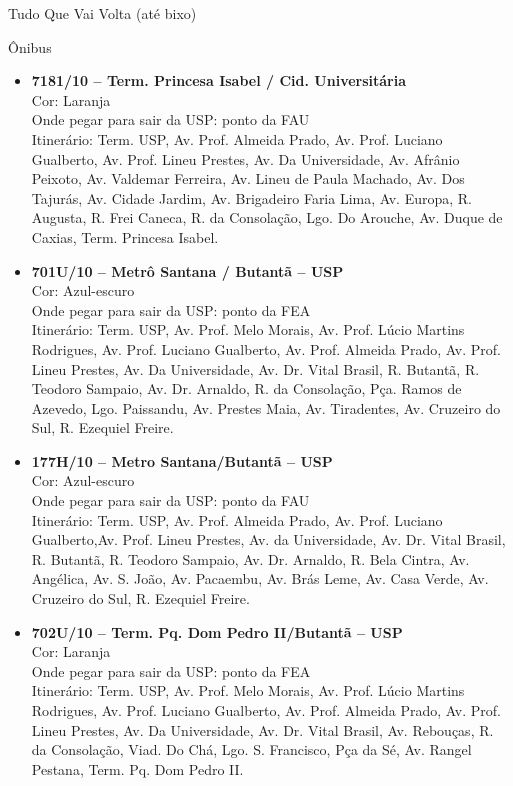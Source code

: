 \begin{secao}{Tudo Que Vai Volta (até bixo)}
\begin{subsecao}{Ônibus}
\begin{itemize}
	\item {\bf 7181/10 – Term. Princesa Isabel / Cid. Universitária}\\
		Cor: Laranja\\
    	Onde pegar para sair da USP: ponto da FAU\\
    	Itinerário: Term. USP, Av. Prof. Almeida Prado, Av. Prof. Luciano
    	Gualberto, Av. Prof. Lineu Prestes, Av. Da Universidade, Av. Afrânio
    	Peixoto, Av. Valdemar Ferreira, Av. Lineu de Paula Machado, Av. Dos 
    	Tajurás, Av. Cidade Jardim, Av. Brigadeiro Faria Lima, Av. Europa, R. 
    	Augusta, R. Frei Caneca, R. da Consolação, Lgo. Do Arouche, Av. Duque
    	de Caxias, Term. Princesa Isabel.

	\item {\bf 701U/10 – Metrô Santana / Butantã – USP}\\
    	Cor: Azul-escuro\\
		Onde pegar para sair da USP: ponto da FEA\\
		Itinerário: Term. USP, Av. Prof. Melo Morais, Av. Prof. Lúcio Martins
		Rodrigues, Av. Prof. Luciano Gualberto, Av. Prof. Almeida Prado, Av. 
		Prof. Lineu Prestes, Av. Da Universidade, Av. Dr. Vital Brasil, R. 
		Butantã, R. Teodoro Sampaio, Av. Dr. Arnaldo, R. da Consolação, Pça.
		Ramos de Azevedo, Lgo. Paissandu, Av. Prestes Maia, Av. Tiradentes, Av.
		Cruzeiro do Sul, R. Ezequiel Freire.

	\item {\bf 177H/10 – Metro Santana/Butantã – USP}\\
	Cor: Azul-escuro\\
	Onde pegar para sair da USP: ponto da FAU\\
	Itinerário: Term. USP, Av. Prof. Almeida Prado, Av. Prof. Luciano 
	Gualberto,Av. Prof. Lineu Prestes, Av. da Universidade, Av. Dr. Vital
	Brasil, R. Butantã, R. Teodoro Sampaio, Av. Dr. Arnaldo, R. Bela Cintra,
	Av. Angélica, Av. S. João, Av. Pacaembu, Av. Brás Leme, Av. Casa Verde,
	Av. Cruzeiro do Sul, R. Ezequiel Freire.

	\item {\bf 702U/10 – Term. Pq. Dom Pedro II/Butantã – USP}\\
	Cor: Laranja\\
	Onde pegar para sair da USP: ponto da FEA\\
	Itinerário: Term. USP, Av. Prof. Melo Morais, Av. Prof. Lúcio Martins
	Rodrigues, Av. Prof. Luciano Gualberto, Av. Prof. Almeida Prado, Av. Prof.
	Lineu Prestes, Av. Da Universidade, Av.	Dr. Vital Brasil, Av. Rebouças, R.
	da Consolação, Viad. Do Chá, Lgo. S. Francisco, Pça da Sé, Av. Rangel 
	Pestana, Term. Pq. Dom Pedro II.


\end{itemize}
\end{subsecao}
\end{secao}
